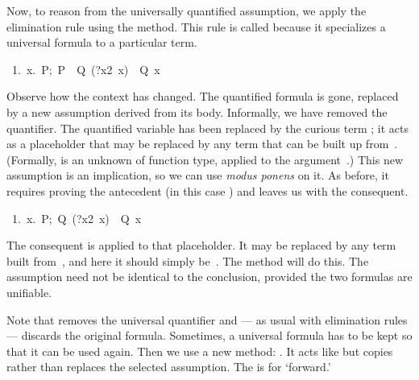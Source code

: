 Now, to reason from the universally quantified 
assumption, we apply the elimination rule using the {} 
method.  This rule is called  because it specializes a universal formula
to a particular term.
\begin{isabelle}
\ 1.\ {\isasymAnd}x.\ {\isasymlbrakk}P;\ P\ \isasymlongrightarrow\ Q\ (?x2\
x){\isasymrbrakk}\ \isasymLongrightarrow\ Q\ x
\end{isabelle}
Observe how the context has changed.  The quantified formula is gone,
replaced by a new assumption derived from its body.  Informally, we have
removed the quantifier.  The quantified variable
has been replaced by the curious term 
; it acts as a placeholder that may be replaced 
by any term that can be built up from~.  (Formally,  is an
unknown of function type, applied to the argument~\bigisa{x}.)  This new assumption is
an implication, so we can  use \emph{modus ponens} on it. As before, it requires
proving the  antecedent (in this case \isa{P}) and leaves us with the consequent. 
\begin{isabelle}
\ 1.\ {\isasymAnd}x.\ {\isasymlbrakk}P;\ Q\ (?x2\ x){\isasymrbrakk}\
\isasymLongrightarrow\ Q\ x
\end{isabelle}
The consequent is  applied to that placeholder.  It may be replaced by any
term built from~, and here 
it should simply be~\bigisa{x}.  The \isa{assumption} method will do this.
The assumption need not be identical to the conclusion, provided the two formulas are
unifiable.  

\medskip
Note that  removes the universal quantifier and --- as
usual with elimination rules --- discards the original formula.  Sometimes, a
universal formula has to be kept so that it can be used again.  Then we use a new
method: \isa{frule}.  It acts like \isa{drule} but copies rather than replaces
the selected assumption.  The \isa{f} is for `forward.'

